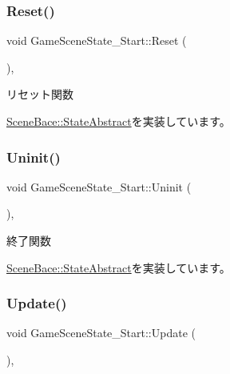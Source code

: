 \subsubsection{\texorpdfstring{Reset()}{Reset()}}
{\footnotesize\ttfamily void Game\+Scene\+State\+\_\+\+Start\+::\+Reset (\begin{DoxyParamCaption}{ }\end{DoxyParamCaption})\hspace{0.3cm}{\ttfamily [override]}, {\ttfamily [virtual]}}



リセット関数 



\mbox{\hyperlink{class_scene_bace_1_1_state_abstract_a006ee828975a964e513d9efb096584de}{Scene\+Bace\+::\+State\+Abstract}}を実装しています。

\mbox{\label{class_game_scene_state___start_a636df8b7ac0173b044b0efc2927fb83b}} 
\subsubsection{\texorpdfstring{Uninit()}{Uninit()}}
{\footnotesize\ttfamily void Game\+Scene\+State\+\_\+\+Start\+::\+Uninit (\begin{DoxyParamCaption}{ }\end{DoxyParamCaption})\hspace{0.3cm}{\ttfamily [override]}, {\ttfamily [virtual]}}



終了関数 



\mbox{\hyperlink{class_scene_bace_1_1_state_abstract_a7d5a67a3f6c1708e55a8cd39649b6813}{Scene\+Bace\+::\+State\+Abstract}}を実装しています。

\mbox{\label{class_game_scene_state___start_ae11bb8d8ea9eae4fea2a9acf33dd1c8b}} 
\subsubsection{\texorpdfstring{Update()}{Update()}}
{\footnotesize\ttfamily void Game\+Scene\+State\+\_\+\+Start\+::\+Update (\begin{DoxyParamCaption}{ }\end{DoxyParamCaption})\hspace{0.3cm}{\ttfamily [override]}, {\ttfamily [virtual]}}



